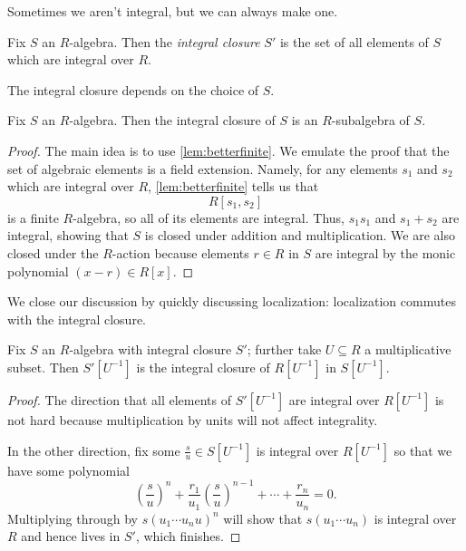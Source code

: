 Sometimes we aren't integral, but we can always make one.
\begin{definition}
	Fix $S$ an $R$-algebra. Then the \textit{integral closure} $S'$ is the set of all elements of $S$ which are integral over $R$.
\end{definition}
\begin{remark}
	The integral closure depends on the choice of $S$.
\end{remark}
\begin{proposition}
	Fix $S$ an $R$-algebra. Then the integral closure of $S$ is an $R$-subalgebra of $S$.
\end{proposition}
\begin{proof}
	The main idea is to use \autoref{lem:betterfinite}. We emulate the proof that the set of algebraic elements is a field extension. Namely, for any elements $s_1$ and $s_2$ which are integral over $R$, \autoref{lem:betterfinite} tells us that
	\[R[s_1,s_2]\]
	is a finite $R$-algebra, so all of its elements are integral. Thus, $s_1s_1$ and $s_1+s_2$ are integral, showing that $S$ is closed under addition and multiplication. We are also closed under the $R$-action because elements $r\in R$ in $S$ are integral by the monic polynomial $(x-r)\in R[x]$.
\end{proof}
We close our discussion by quickly discussing localization: localization commutes with the integral closure.
\begin{proposition}
	Fix $S$ an $R$-algebra with integral closure $S'$; further take $U\subseteq R$ a multiplicative subset. Then $S'\left[U^{-1}\right]$ is the integral closure of $R\left[U^{-1}\right]$ in $S\left[U^{-1}\right]$.
\end{proposition}
\begin{proof}
	The direction that all elements of $S'\left[U^{-1}\right]$ are integral over $R\left[U^{-1}\right]$ is not hard because multiplication by units will not affect integrality.
	
	In the other direction, fix some $\frac su\in S\left[U^{-1}\right]$ is integral over $R\left[U^{-1}\right]$ so that we have some polynomial
	\[\left(\frac su\right)^n+\frac{r_1}{u_1}\left(\frac su\right)^{n-1}+\cdots+\frac{r_n}{u_n}=0.\]
	Multiplying through by $s(u_1\cdots u_nu)^n$ will show that $s(u_1\cdots u_n)$ is integral over $R$ and hence lives in $S'$, which finishes.
\end{proof}


